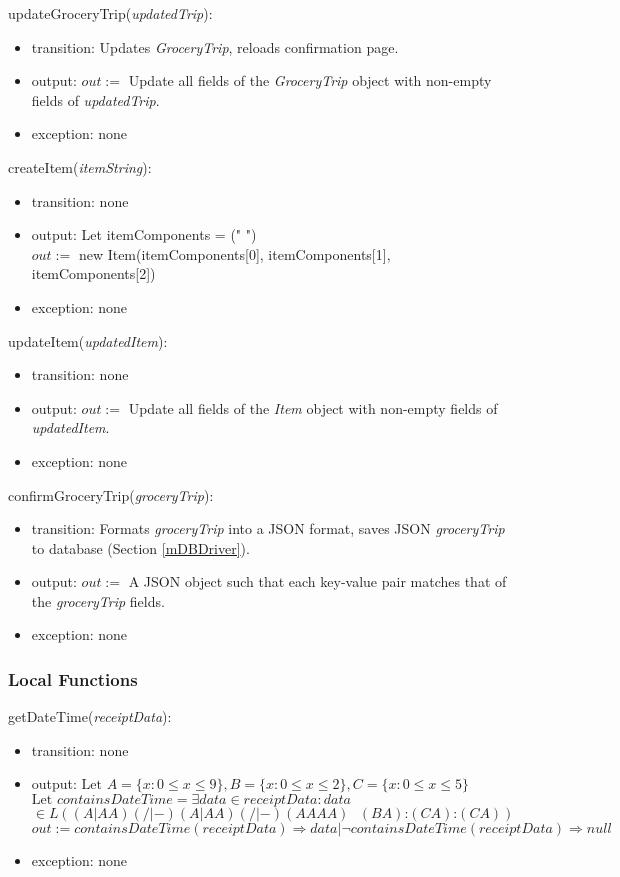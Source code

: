\documentclass[12pt, titlepage]{article}
\begin{document}
\noindent updateGroceryTrip(\textit{updatedTrip}):
\begin{itemize}
  \item transition: Updates \textit{GroceryTrip}, reloads confirmation page.
  \item output: $out :=$ Update all fields of the \textit{GroceryTrip} object with non-empty fields of \textit{updatedTrip}.
  \item exception: none
\end{itemize}

\noindent createItem(\textit{itemString}):
\begin{itemize}
  \item transition: none
  \item output: Let itemComponents = (" ") \\
                $out :=$ new Item(itemComponents[0], itemComponents[1], itemComponents[2])
  \item exception: none
\end{itemize}

\noindent updateItem(\textit{updatedItem}):
\begin{itemize}
  \item transition: none
  \item output: $out :=$ Update all fields of the \textit{Item} object with non-empty fields of \textit{updatedItem}.
  \item exception: none
\end{itemize}

\noindent confirmGroceryTrip(\textit{groceryTrip}):
\begin{itemize}
  \item transition: Formats \textit{groceryTrip} into a JSON format, saves JSON \textit{groceryTrip} to database (Section \ref{mDBDriver}).
  \item output: $out := $ A JSON object such that each key-value pair matches that of the \textit{groceryTrip}
                fields.
  \item exception: none
\end{itemize}

\subsubsection{Local Functions}

\noindent getDateTime(\textit{receiptData}):
\begin{itemize}
  \item transition: none
  \item output: $\text{Let } A=\{x : 0 \leq x \leq 9\}, B=\{x : 0 \leq x \leq 2\}, C=\{x : 0 \leq x \leq 5\}$ \\
                $\text{Let } containsDateTime=\exists data \in receiptData : data$\\ $\in L((A|AA)(/|-)(A|AA)(/|-)(AAAA)\text{ }(BA)\text{:}(CA)\text{:}(CA))$ \\
                $out := containsDateTime(receiptData) \Rightarrow data | \neg containsDateTime(receiptData) \Rightarrow null$
  \item exception: none
\end{itemize}
\end{document}
